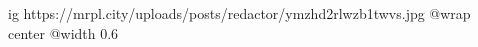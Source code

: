  
 
 
 
 

\ifcmt
  ig https://mrpl.city/uploads/posts/redactor/ymzhd2rlwzb1twvs.jpg
  @wrap center
  @width 0.6
\fi
